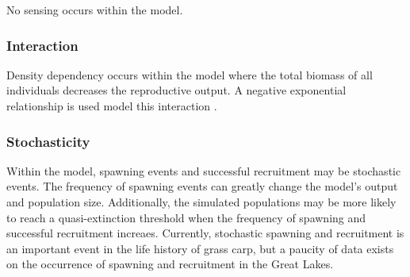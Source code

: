 \documentclass{article}[12pt]
\begin{document}
No sensing occurs within the model. 


\subsubsection{Interaction}

Density dependency occurs within the model where the total biomass of all individuals decreases the reproductive output.  
A negative exponential relationship is used model this interaction \citep{bolker2008ecological}. 


\subsubsection{Stochasticity}\label{stoc}

Within the model, spawning events and successful recruitment may be stochastic events. 
The frequency of spawning events can greatly change the model's output and population size.
Additionally, the simulated populations may be more likely to reach a quasi-extinction threshold when the frequency of spawning and successful recruitment increaes.
Currently, stochastic spawning and recruitment is an important event in the life history of grass carp, but a paucity of data exists on the occurrence of spawning and recruitment in the Great Lakes. 


\end{document}
